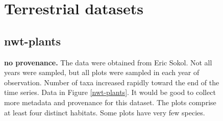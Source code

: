 \documentclass[11pt, oneside]{article}
\begin{document}
\begin{figure}[h!]
\section {Terrestrial datasets}

\subsection {nwt-plants}
{\bf no provenance.}
The data were obtained from Eric Sokol.
Not all years were sampled, but all plots were sampled in each year of observation. 
 Number of taxa increased rapidly toward the end of the time series. 
 Data in Figure \ref{nwt-plants}.
 It would be good to collect more metadata and provenance for this dataset.
 The plots comprise at least four distinct habitats.
 Some plots have very few species.


\end{figure}
\end{document}

